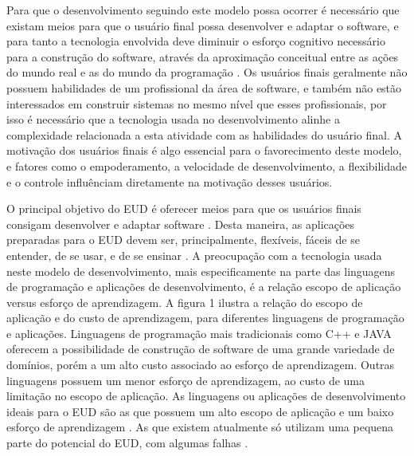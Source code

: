 Para que o desenvolvimento seguindo este modelo possa ocorrer é necessário que existam meios para que o usuário final possa desenvolver e adaptar o software, e para tanto a tecnologia envolvida deve diminuir o esforço cognitivo necessário para a construção do software, através da aproximação conceitual entre as ações do mundo real e as do mundo da programação \cite{fischer2004}. Os usuários finais geralmente não possuem habilidades de um profissional da área de software, e também não estão interessados em construir sistemas no mesmo nível que esses profissionais, por isso é necessário que a tecnologia usada no desenvolvimento alinhe a complexidade relacionada a esta atividade com as habilidades do usuário final. A motivação dos usuários finais é algo essencial para o favorecimento deste modelo, e fatores como o empoderamento, a velocidade de desenvolvimento, a flexibilidade e o controle influênciam diretamente na motivação desses usuários.

O principal objetivo do EUD é oferecer meios para que os usuários finais consigam desenvolver e adaptar software \cite{lieberman2006}. Desta maneira, as aplicações preparadas para o EUD devem ser, principalmente, flexíveis, fáceis de se entender, de se usar, e de se ensinar \cite{lieberman2006}. A preocupação com a tecnologia usada neste modelo de desenvolvimento, mais especificamente na parte das linguagens de programação e aplicações de desenvolvimento, é a relação escopo de aplicação versus esforço de aprendizagem. A figura 1 ilustra a relação do escopo de aplicação e do custo de aprendizagem, para diferentes linguagens de programação e aplicações. Linguagens de programação mais tradicionais como C++ e JAVA oferecem a possibilidade de construção de software de uma grande variedade de domínios, porém a um alto custo associado ao esforço de aprendizagem. Outras linguagens possuem um menor esforço de aprendizagem, ao custo de uma limitação no escopo de aplicação. As linguagens ou aplicações de desenvolvimento ideais para o EUD são as que possuem um alto escopo de aplicação e um baixo esforço de aprendizagem \cite{fischer2004}. As que existem atualmente só utilizam uma pequena parte do potencial do EUD, com algumas falhas \cite{paterno2013}.

